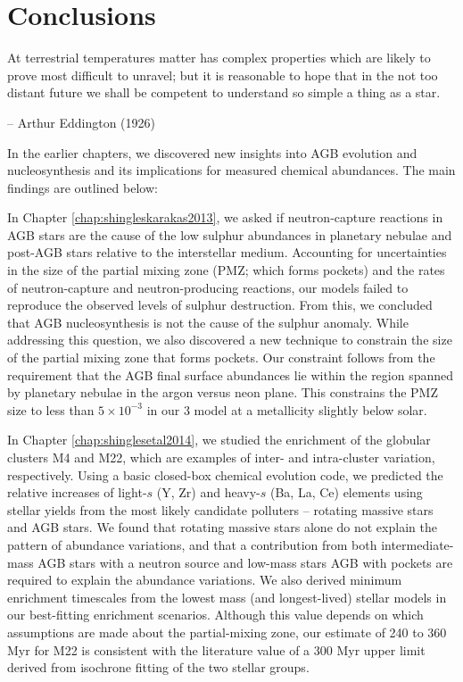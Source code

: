 \chapter{Conclusions}\label{chap:conclusions}

\epigraph{At terrestrial temperatures matter has complex properties which are likely to prove most difficult to unravel; but it is reasonable to hope that in the not too distant future we shall be competent to understand so simple a thing as a star.}{-- Arthur Eddington (1926)\footnotemark}


In the earlier chapters, we discovered new insights into \gls{AGB} evolution and nucleosynthesis and its implications for measured chemical abundances. The main findings are outlined below:

In Chapter \ref{chap:shingleskarakas2013}, we asked if neutron-capture reactions in \gls{AGB} stars are the cause of the low sulphur abundances in planetary nebulae and post-AGB stars relative to the interstellar medium. Accounting for uncertainties in the size of the partial mixing zone (PMZ; which forms  pockets) and the rates of neutron-capture and neutron-producing reactions, our models failed to reproduce the observed levels of sulphur destruction. From this, we concluded that \gls{AGB} nucleosynthesis is not the cause of the sulphur anomaly. While addressing this question, we also discovered a new technique to constrain the size of the partial mixing zone that forms  pockets. Our constraint follows from the requirement that the AGB final surface abundances lie within the region spanned by planetary nebulae in the argon versus neon plane. This constrains the PMZ size to less than $5 \times 10^{-3}$ \Msun in our 3 \Msun model at a metallicity slightly below solar.

In Chapter \ref{chap:shinglesetal2014}, we studied the \sprocess enrichment of the globular clusters M4 and M22, which are examples of inter- and intra-cluster variation, respectively. Using a basic closed-box chemical evolution code, we predicted the relative increases of light-$s$ (Y, Zr) and heavy-$s$ (Ba, La, Ce) elements using stellar yields from the most likely candidate polluters -- rotating massive stars and AGB stars. We found that rotating massive stars alone do not explain the pattern of abundance variations, and that a contribution from both intermediate-mass AGB stars with a  neutron source and low-mass stars AGB with  pockets are required to explain the abundance variations. We also derived minimum enrichment timescales from the lowest mass (and longest-lived) stellar models in our best-fitting enrichment scenarios. Although this value depends on which assumptions are made about the partial-mixing zone, our estimate of 240 to 360 Myr for M22 is consistent with the literature value of a 300 Myr upper limit derived from isochrone fitting of the two stellar groups.

